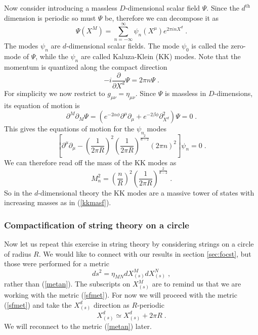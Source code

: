 \documentclass[11pt,a4paper]{article}
\numberwithin{equation}{section}
\numberwithin{table}{section}\setlength{\multlinegap}{25pt}
\newcommand{\be}{\begin{equation}}
\newcommand{\ee}{\end{equation}}
\begin{document}
Now consider introducing a massless $D$-dimensional scalar field $\Psi$. Since the $d^{\mathrm{th}}$ dimension is periodic so must $\Psi$ be, therefore we can decompose it as
\be
\Psi\left(X^M\right) = \sum_{n=-\infty}^{\infty} \psi_n\left(X^{\mu}\right)e^{2\pi i n X^d} \;.
\label{KKexp}
\ee
The modes $\psi_n$ are $d$-dimensional scalar fields. The mode $\psi_0$ is called the zero-mode of $\Psi$, while the $\psi_n$ are called Kaluza-Klein (KK) modes. Note that the momentum is quantized along the compact direction
\be
-i\frac{\partial}{\partial X^d} \Psi = 2 \pi n \Psi \;.
\ee
For simplicity we now restrict to $g_{\mu\nu}=\eta_{\mu\nu}$. Since $\Psi$ is massless in $D$-dimensions, its equation of motion is
\be
\partial^M\partial_M \Psi = \left(e^{-2\alpha \phi} \partial^{\mu}\partial_{\mu} + e^{-2\beta\phi} \partial^2_{X^d}\right) \Psi=0 \;.
\ee
This gives the equations of motion for the $\psi_n$ modes
\be
\left[\partial^{\mu} \partial_{\mu} - \left(\frac{1}{2\pi R}\right)^{2} \left(\frac{1}{2\pi R}\right)^{\frac{2}{d-2}} \left(2 \pi n \right)^2 \right] \psi_n = 0 \;.
\ee
We can therefore read off the mass of the KK modes as 
\be
M_n^2 = \left(\frac{n}{R}\right)^2  \left(\frac{1}{2\pi R}\right)^{\frac{2}{d-2}} \;.
\label{kkmasf}
\ee
So in the $d$-dimensional theory the KK modes are a massive tower of states with increasing masses as in (\ref{kkmasf}).

\subsubsection{Compactification of string theory on a circle}

Now let us repeat this exercise in string theory by considering strings on a circle of radius $R$.  
We would like to connect with our results in section \ref{sec:focst}, but those were performed for a metric 
\be
ds^2=\eta_{MN} dX_{(s)}^M dX_{(s)}^N \;,
\label{sfmet}
\ee
rather than (\ref{metan}). The subscripts on $X_{(s)}^M$ are to remind us that we are working with the metric (\ref{sfmet}). For now we will proceed with the metric (\ref{sfmet}) and take the $X_{(s)}^d$ direction as $R$-periodic
\be
X_{(s)}^d \simeq X_{(s)}^d + 2 \pi R \;.
\ee
We will reconnect to the metric (\ref{metan}) later.
\end{document}

